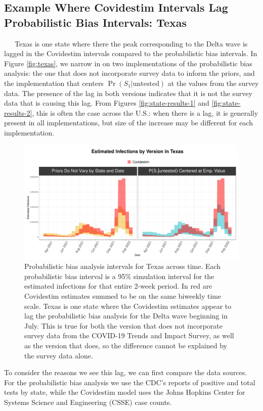 \documentclass[12pt,twoside]{smiththesis}
\begin{document}
\hypertarget{example-where-covidestim-intervals-lag-probabilistic-bias-intervals-texas}{%
\subsection{Example Where Covidestim Intervals Lag Probabilistic Bias Intervals: Texas}\label{example-where-covidestim-intervals-lag-probabilistic-bias-intervals-texas}}

~~~Texas is one state where there the peak corresponding to the Delta wave is lagged in the Covidestim intervals compared to the probabilistic bias intervals. In Figure \ref{fig:texas}, we narrow in on two implementations of the probabilistic bias analysis: the one that does not incorporate survey data to inform the priors, and the implementation that centers \(\Pr(S_1|\text{untested})\) at the values from the survey data. The presence of the lag in both versions indicates that it is not the survey data that is causing this lag. From Figures \ref{fig:state-results-1} and \ref{fig:state-results-2}, this is often the case across the U.S.: when there is a lag, it is generally present in all implementations, but size of the increase may be different for each implementation.
\begin{figure}
\includegraphics[width=1\linewidth]{figure/texas-lag} \caption{\label{fig:texas} Probabilistic bias analysis intervals for Texas across time. Each probabilistic bias interval is a 95\% simulation interval for the estimated infections for that entire 2-week period. In red are Covidestim estimates summed to be on the same biweekly time scale. Texas is one state where the Covidestim estimates appear to lag the probabilistic bias analysis for the Delta wave beginning in July. This is true for both the version that does not incorporate survey data from the COVID-19 Trends and Impact Survey, as well as the version that does, so the difference cannot be explained by the survey data alone.}\label{fig:unnamed-chunk-69}
\end{figure}
To consider the reasons we see this lag, we can first compare the data sources. For the probabilistic bias analysis we use the CDC's reports of positive and total tests by state, while the Covidestim model uses the Johns Hopkins Center for Systems Science and Engineering (CSSE) case counts.
\end{document}
